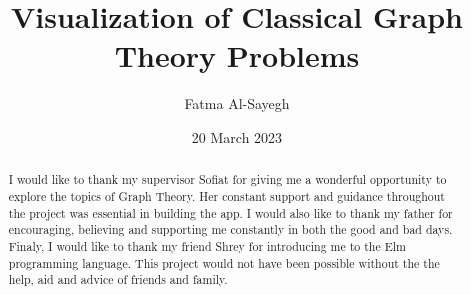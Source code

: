 \documentclass{l4proj}
\begin{document}
\title{Visualization of Classical Graph Theory Problems}
\author{Fatma Al-Sayegh}
\date{20 March 2023}

\maketitle

\begin{abstract}

\end{abstract}

\renewcommand{\abstractname}{Acknowledgements}
\begin{abstract}
 I would like to thank my supervisor Sofiat for giving me a wonderful
    opportunity to explore the topics of Graph Theory. Her constant support and
    guidance throughout the project was essential in building the app. I would
    also like to thank my father for encouraging, believing and supporting me
    constantly in both the good and bad days. Finaly, I would like to thank my
    friend Shrey for introducing me to the Elm programming language. This
    project would not have been possible without the the help, aid and advice
    of friends and family. 
\end{abstract}

%
%
\def\consentname {Fatma Al-Sayegh} %
\def\consentdate {20 November 2022} %
%
\educationalconsent


\tableofcontents
\end{document}
